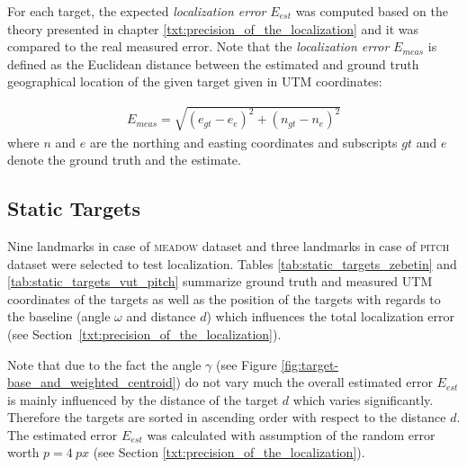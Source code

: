 For each target, the expected \textit{localization error} $E_{est}$ was computed based on the theory presented in chapter \ref{txt:precision_of_the_localization} and it was compared to the real measured error. Note that the \textit{localization error} $E_{meas}$ is defined as the Euclidean distance between the estimated and ground truth geographical location of the given target given in UTM coordinates:

\begin{align}
	E_{meas} = \sqrt{(e_{gt} - e_{e})^{2} + (n_{gt} - n_{e})^{2}}
\end{align}
where $n$ and $e$ are the northing and easting coordinates and subscripts $gt$ and $e$ denote the ground truth and the estimate.

\subsection{Static Targets}

Nine landmarks in case of \textsc{meadow} dataset and three landmarks in case of \textsc{pitch} dataset were selected to test localization. Tables \ref{tab:static_targets_zebetin} and \ref{tab:static_targets_vut_pitch} summarize ground truth and measured UTM coordinates of the targets as well as the position of the targets with regards to the baseline (angle $\omega$ and distance $d$) which influences the total localization error (see Section~\ref{txt:precision_of_the_localization}). 

Note that due to the fact the angle $\gamma$ (see Figure \ref{fig:target-base_and_weighted_centroid}) do not vary much the overall estimated error $E_{est}$ is mainly influenced by the distance of the target $d$ which varies significantly. Therefore the targets are sorted in ascending order with respect to the distance $d$. The estimated error $E_{est}$ was calculated with assumption of the random error worth $p = 4~px$ (see Section \ref{txt:precision_of_the_localization}). 

